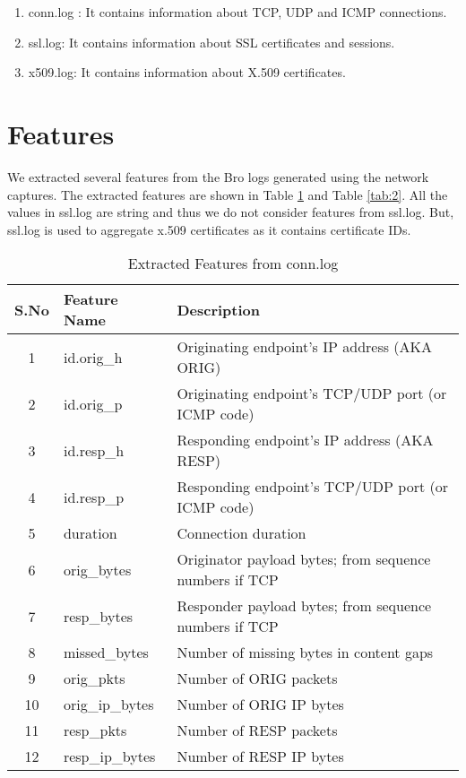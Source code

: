 \begin{enumerate}
	\item conn.log : It contains information about TCP, UDP and ICMP connections.
	\item ssl.log: It contains information about SSL certificates and sessions.
	\item x509.log: It contains information about X.509 certificates.
\end{enumerate}

\section{Features}

We extracted several features from the Bro logs generated using the network captures. The extracted features are shown in Table \ref{tab:1} and Table \ref{tab:2}. All the values in ssl.log are string and thus we do not consider features from ssl.log. But, ssl.log is used to aggregate x.509 certificates as it contains certificate IDs.

\begin{table}[!htb]
	\caption{Extracted Features from conn.log\label{tab:1}}
	\begin{center}
		\begin{tabular}{c|p{}|p{}}\hline\hline
			S.No & Feature Name & \multicolumn{1}{l}{Description} \\ \hline
			1 & id.orig\_h & Originating endpoint's IP address (AKA ORIG) \\
			2 & id.orig\_p	& Originating endpoint's TCP/UDP port (or ICMP code) \\
			3 & id.resp\_h	& Responding endpoint's IP address (AKA RESP) \\
			4 & id.resp\_p	& Responding endpoint's TCP/UDP port (or ICMP code) \\
			5 & duration & Connection duration \\
			6 & orig\_bytes  & Originator payload bytes; from sequence numbers if TCP \\
			7 & resp\_bytes & Responder payload bytes; from sequence numbers if TCP \\
			8 & missed\_bytes & Number of missing bytes in content gaps \\
			9 & orig\_pkts & Number of ORIG packets \\
			10 & orig\_ip\_bytes & Number of ORIG IP bytes \\
			11 & resp\_pkts & Number of RESP packets\\
			12 & resp\_ip\_bytes & Number of RESP IP bytes \\ 
			\hline\hline
		\end{tabular}
	\end{center}
\end{table}

